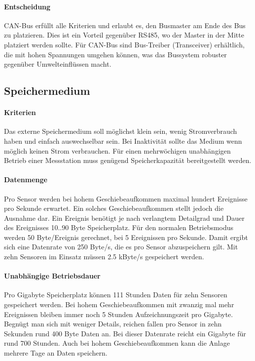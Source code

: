 \paragraph{Entscheidung}
CAN-Bus erfüllt alle Kriterien und erlaubt es, den Busmaster am Ende des Bus zu platzieren. Dies ist ein Vorteil gegenüber RS485, wo der Master in der Mitte platziert werden sollte. Für CAN-Bus sind Bus-Treiber (Transceiver) erhältlich, die mit hohen Spannungen umgehen können, was das Bussystem robuster gegenüber Umwelteinflüssen macht. 



\subsection{Speichermedium}
\paragraph{Kriterien} Das externe Speichermedium soll möglichst klein sein, wenig Stromverbrauch haben und einfach auswechselbar sein. Bei Inaktivität sollte das Medium wenn möglich keinen Strom verbrauchen. Für einen mehrwöchigen unabhängigen Betrieb einer Messstation muss genügend Speicherkapazität bereitgestellt werden.

\paragraph{Datenmenge} Pro Sensor werden bei hohem Geschiebeaufkommen maximal hundert Ereignisse pro Sekunde erwartet. Ein solches Geschiebeaufkommen stellt jedoch die Ausnahme dar. Ein Ereignis benötigt je nach verlangtem Detailgrad und Dauer des Ereignisses 10..90 Byte Speicherplatz. Für den normalen Betriebsmodus werden 50 Byte/Ereignis gerechnet, bei 5 Ereignissen pro Sekunde. Damit ergibt sich eine Datenrate von 250 Byte/s, die es pro Sensor abzuspeichern gilt. Mit zehn Sensoren im Einsatz müssen 2.5 kByte/s gespeichert werden. 

\paragraph{Unabhängige Betriebsdauer} Pro Gigabyte Speicherplatz können 111 Stunden Daten für zehn Sensoren gespeichert werden. Bei hohem Geschiebeaufkommen mit zwanzig mal mehr Ereignissen bleiben immer noch 5 Stunden Aufzeichnungszeit pro Gigabyte. Begnügt man sich mit weniger Details, reichen fallen pro Sensor in zehn Sekunden rund 400 Byte Daten an. Bei dieser Datenrate reicht ein Gigabyte für rund 700 Stunden. Auch bei hohem Geschiebeaufkommen kann die Anlage mehrere Tage an Daten speichern. 

